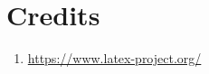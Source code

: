 \chapter*{Credits}



\begin{enumerate}
	\item \url{https://www.latex-project.org/}
\end{enumerate}






